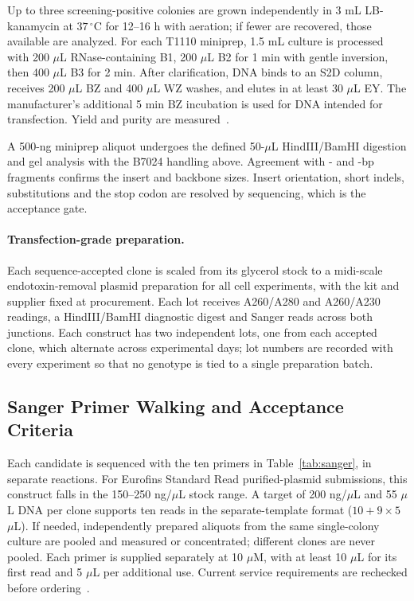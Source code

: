 Up to three screening-positive colonies are grown independently in 3 mL LB-kanamycin at $37\,^{\circ}$C for 12--16 h with aeration; if fewer are recovered, those available are analyzed. For each T1110 miniprep, 1.5 mL culture is processed with 200 $\mu$L RNase-containing B1, 200 $\mu$L B2 for 1 min with gentle inversion, then 400 $\mu$L B3 for 2 min. After clarification, DNA binds to an S2D column, receives 200 $\mu$L BZ and 400 $\mu$L WZ washes, and elutes in at least 30 $\mu$L EY. The manufacturer's additional 5 min BZ incubation is used for DNA intended for transfection. Yield and purity are measured~\cite{MethodM11,MethodM18}.

A 500-ng miniprep aliquot undergoes the defined 50-$\mu$L HindIII/BamHI digestion and gel analysis with the B7024 handling above. Agreement with \BackboneBp{}- and \InsertBp{}-bp fragments confirms the insert and backbone sizes. Insert orientation, short indels, substitutions and the stop codon are resolved by sequencing, which is the acceptance gate.

\paragraph{Transfection-grade preparation.} Each sequence-accepted clone is scaled from its glycerol stock to a midi-scale endotoxin-removal plasmid preparation for all cell experiments, with the kit and supplier fixed at procurement. Each lot receives A260/A280 and A260/A230 readings, a HindIII/BamHI diagnostic digest and Sanger reads across both junctions. Each construct has two independent lots, one from each accepted clone, which alternate across experimental days; lot numbers are recorded with every experiment so that no genotype is tied to a single preparation batch.

\subsection{Sanger Primer Walking and Acceptance Criteria}
Each candidate is sequenced with the ten primers in Table~\ref{tab:sanger}, in separate reactions. For Eurofins Standard Read purified-plasmid submissions, this construct falls in the 150--250 ng/$\mu$L stock range. A target of 200 ng/$\mu$L and 55 $\mu$L DNA per clone supports ten reads in the separate-template format ($10+9\times5$ $\mu$L). If needed, independently prepared aliquots from the same single-colony culture are pooled and measured or concentrated; different clones are never pooled. Each primer is supplied separately at 10 $\mu$M, with at least 10 $\mu$L for its first read and 5 $\mu$L per additional use. Current service requirements are rechecked before ordering~\cite{MethodM13}.

